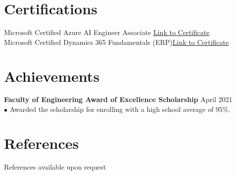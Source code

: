 \documentclass[letterpaper,12pt]{article}
\begin{document}
\section{Certifications}
Microsoft Certified Azure AI Engineer Associate \hfill \href{https://learn.microsoft.com/en-us/users/zichengli-4388/credentials/8f80de9e7944a10}{Link to Certificate}\\
Microsoft Certified Dynamics 365 Fundamentals (ERP)\hfill \href{https://learn.microsoft.com/en-us/users/zichengli-4388/credentials/5d28421aefedb4ec}{Link to Certificate}
\section{Achievements}
\textbf{Faculty of Engineering Award of Excellence Scholarship}  \hfill  \normalsize{April 2021} \\
$\bullet$ Awarded the scholarship for enrolling with a high school average of 95\%.
\section{References}
References available upon request
\end{document}
